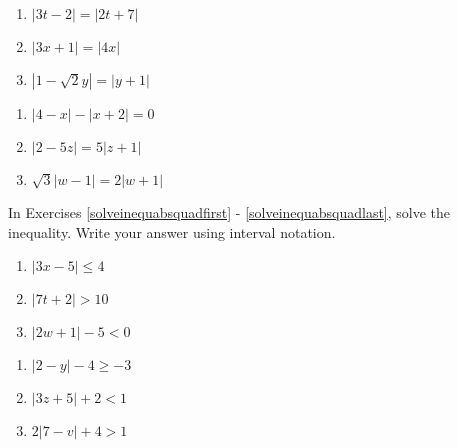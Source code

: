 \documentclass{ximera}
\begin{document}
\begin{multicols}{3}
\begin{enumerate}
\setcounter{enumi}{\value{HW}}

\item $|3t - 2| = |2t + 7|$  
\item $|3x+1| = |4x|$
\item $|1-\sqrt{2} y| = |y+1|$

\setcounter{HW}{\value{enumi}}
\end{enumerate}
\end{multicols}


\begin{multicols}{3}
\begin{enumerate}
\setcounter{enumi}{\value{HW}}

\item  $|4-x| - |x+2| = 0$
\item $|2-5z| = 5 |z+1|$
\item $\sqrt{3}|w-1| = 2|w+1|$ \label{solveabsvalequlast}


\setcounter{HW}{\value{enumi}}
\end{enumerate}
\end{multicols}


In Exercises \ref{solveinequabsquadfirst} - \ref{solveinequabsquadlast}, solve the inequality.  Write your answer using interval notation. 

\begin{multicols}{3}
\begin{enumerate}
\setcounter{enumi}{\value{HW}}
\item $|3x - 5| \leq 4$ \label{solveinequabsquadfirst}
\item $|7t + 2| > 10$
\item $|2w+1| - 5 < 0$   
\setcounter{HW}{\value{enumi}}
\end{enumerate}
\end{multicols}

\begin{multicols}{3}
\begin{enumerate}
\setcounter{enumi}{\value{HW}}


\item $|2-y| - 4 \geq -3$
\item $|3z+5| + 2 < 1$   
\item $2|7-v| +4 > 1$

\setcounter{HW}{\value{enumi}}
\end{enumerate}
\end{multicols}
\end{document}
